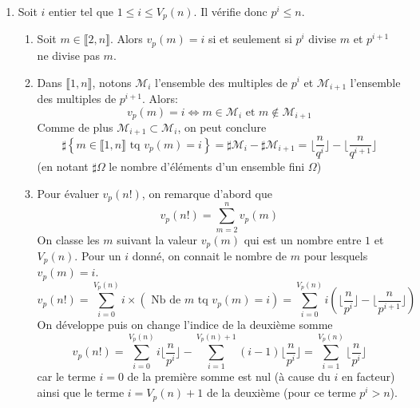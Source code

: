 \begin{enumerate}
  \item Soit $i$ entier tel que $1 \leq i \leq V_p(n)$. Il vérifie donc $p^i \leq n$.
\begin{enumerate}
\item Soit $m\in \llbracket 2,n \rrbracket$. Alors $v_p(m)=i$ si et seulement si $p^i$ divise $m$ et $p^{i+1}$ ne divise pas $m$. 
\item Dans $\llbracket 1,n \rrbracket$, notons $\mathcal{M}_i$ l'ensemble des multiples de $p^i$ et $\mathcal{M}_{i+1}$ l'ensemble des multiples de $p^{i+1}$. Alors:
\begin{displaymath}
  v_p(m) = i \Leftrightarrow m\in \mathcal{M}_i \text{ et } m\notin \mathcal{M}_{i+1}
\end{displaymath}
Comme de plus $\mathcal{M}_{i+1} \subset \mathcal{M}_{i}$, on peut conclure
\begin{displaymath}
  \sharp\left\lbrace m\in \llbracket 1,n\rrbracket \text{ tq } v_p(m)=i\right\rbrace 
= \sharp \mathcal{M}_{i} - \sharp \mathcal{M}_{i+1} = \lfloor \frac{n}{q^i} \rfloor - \lfloor \frac{n}{q^{i+1}} \rfloor
\end{displaymath}
(en notant $\sharp \Omega$ le nombre d'éléments d'un ensemble fini $\Omega$) 

\item Pour évaluer $v_p(n!)$, on remarque d'abord que 
\begin{displaymath}
  v_p(n!) = \sum_{m=2}^n v_p(m)
\end{displaymath}
On classe les $m$ suivant la valeur $v_p(m)$ qui est un nombre entre $1$ et $V_p(n)$. Pour un $i$ donné, on connait le nombre de $m$ pour lesquels $v_p(m)=i$.
\begin{displaymath}
v_p(n!) = \sum_{i=0}^{V_p(n)}i\times\left( \text{ Nb de $m$ tq $v_p(m)=i$}\right)   
 = \sum_{i=0}^{V_p(n)}i\left( \lfloor \frac{n}{p^i}\rfloor - \lfloor \frac{n}{p^{i+1}}\rfloor\right) 
\end{displaymath}
On développe puis on change l'indice de la deuxième somme
\begin{displaymath}
v_p(n!) = \sum_{i=0}^{V_p(n)}i \lfloor \frac{n}{p^i}\rfloor - \sum_{i=1}^{V_p(n)+1}(i-1) \lfloor \frac{n}{p^i}\rfloor 
= \sum_{i=1}^{V_p(n)} \lfloor \frac{n}{p^i}\rfloor
\end{displaymath}
car le terme $i=0$ de la première somme est nul (à cause du $i$ en facteur) ainsi que le terme $i=V_p(n)+1$ de la deuxième (pour ce terme $p^i>n$).
\end{enumerate}


\end{enumerate}
